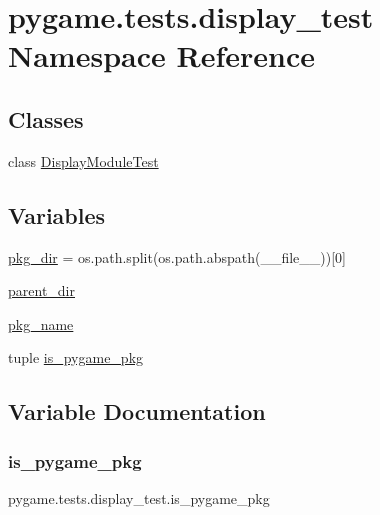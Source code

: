 \hypertarget{namespacepygame_1_1tests_1_1display__test}{}\section{pygame.\+tests.\+display\+\_\+test Namespace Reference}
\label{namespacepygame_1_1tests_1_1display__test}
\subsection*{Classes}
\begin{DoxyCompactItemize}
\item 
class \hyperlink{classpygame_1_1tests_1_1display__test_1_1_display_module_test}{Display\+Module\+Test}
\end{DoxyCompactItemize}
\subsection*{Variables}
\begin{DoxyCompactItemize}
\item 
\hyperlink{namespacepygame_1_1tests_1_1display__test_a6ceafb8b1e059b885724ea7536ed83a0}{pkg\+\_\+dir} = os.\+path.\+split(os.\+path.\+abspath(\+\_\+\+\_\+file\+\_\+\+\_\+))\mbox{[}0\mbox{]}
\item 
\hyperlink{namespacepygame_1_1tests_1_1display__test_abcdd031ece27df15d92fdeda3b9b7264}{parent\+\_\+dir}
\item 
\hyperlink{namespacepygame_1_1tests_1_1display__test_adba3db2cad8dcff4d0b5f1a5812074b5}{pkg\+\_\+name}
\item 
tuple \hyperlink{namespacepygame_1_1tests_1_1display__test_ab5fc6a610034de045d524a9d161479ef}{is\+\_\+pygame\+\_\+pkg}
\end{DoxyCompactItemize}


\subsection{Variable Documentation}
\mbox{\label{namespacepygame_1_1tests_1_1display__test_ab5fc6a610034de045d524a9d161479ef}} 
\subsubsection{\texorpdfstring{is\+\_\+pygame\+\_\+pkg}{is\_pygame\_pkg}}
{\footnotesize\ttfamily pygame.\+tests.\+display\+\_\+test.\+is\+\_\+pygame\+\_\+pkg}

